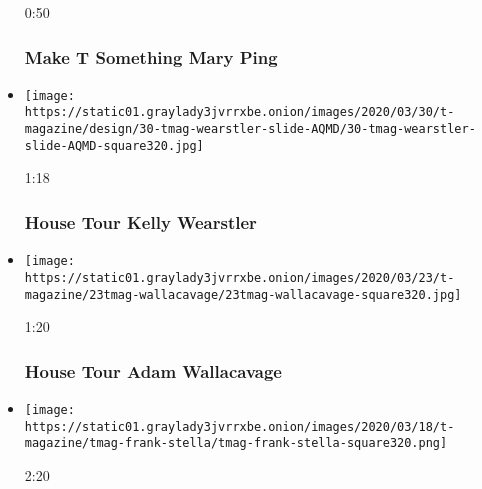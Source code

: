 \begin{itemize}
  0:50

  \hypertarget{make-t-something--mary-ping}{%
  \subsubsection{Make T Something \textbar{} Mary
  Ping}\label{make-t-something--mary-ping}}
\item
  \href{https://www.nytimes3xbfgragh.onion/video/t-magazine/design/100000007053619/house-tour-kelly-wearstler.html?action=click\&module=video-series-bar\&region=header\&pgtype=Article\&playlistId=video/t-magazine}{}

  \texttt{[image: https://static01.graylady3jvrrxbe.onion/images/2020/03/30/t-magazine/design/30-tmag-wearstler-slide-AQMD/30-tmag-wearstler-slide-AQMD-square320.jpg]}

  1:18

  \hypertarget{house-tour--kelly-wearstler}{%
  \subsubsection{House Tour \textbar{} Kelly
  Wearstler}\label{house-tour--kelly-wearstler}}
\item
  \href{https://www.nytimes3xbfgragh.onion/video/t-magazine/100000007038918/house-tour-adam-wallacavage.html?action=click\&module=video-series-bar\&region=header\&pgtype=Article\&playlistId=video/t-magazine}{}

  \texttt{[image: https://static01.graylady3jvrrxbe.onion/images/2020/03/23/t-magazine/23tmag-wallacavage/23tmag-wallacavage-square320.jpg]}

  1:20

  \hypertarget{house-tour--adam-wallacavage}{%
  \subsubsection{House Tour \textbar{} Adam
  Wallacavage}\label{house-tour--adam-wallacavage}}
\item
  \href{https://www.nytimes3xbfgragh.onion/video/t-magazine/100000007025848/my-favorite-artwork-frank-stella.html?action=click\&module=video-series-bar\&region=header\&pgtype=Article\&playlistId=video/t-magazine}{}

  \texttt{[image: https://static01.graylady3jvrrxbe.onion/images/2020/03/18/t-magazine/tmag-frank-stella/tmag-frank-stella-square320.png]}

  2:20

  \hypertarget{my-favorite-artwork--frank-stella}{%
}
\end{itemize}
